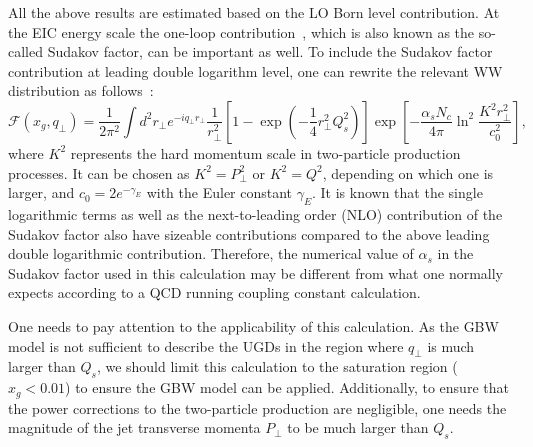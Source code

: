 All the above results are estimated based on the LO Born level
contribution. At the EIC energy scale the one-loop
contribution~\cite{Mueller:2012uf}, which is also known as the so-called Sudakov
factor, can be important as well. To include the Sudakov factor contribution at
leading double logarithm level, one can rewrite the relevant WW distribution as
follows~\cite{Mueller:2013wwa}:
\begin{equation}
\mathcal{F}(x_{g}, q_{\perp}) =
\frac{1}{2\pi^{2}} \int d^{2}r_{\perp} e^{-iq_{\perp}r_{\perp}}
\frac{1}{r^{2}_{\perp}}[1-\exp(-\frac{1}{4}r^{2}_{\perp}Q^{2}_{s})]
\exp[-\frac{\alpha_sN_c}{4\pi}\ln^2\frac{K^2r_{\perp}^2}{c^2_0}],
\label{eqn:Sudakov}
\end{equation}
where $K^2$ represents the hard momentum scale in two-particle production
processes. It can be chosen as $K^2=P^2_{\perp}$ or $K^2=Q^2$, depending on which
one is larger, and $c_0=2e^{-\gamma_E}$ with the Euler constant $\gamma_E$. It
is known that the single logarithmic terms as well as the next-to-leading order
(NLO) contribution of the Sudakov factor also have sizeable contributions 
compared to the above leading double logarithmic contribution. Therefore, the
numerical value of $\alpha_s$ in the Sudakov factor used in this calculation may
be different from what one normally expects according to a QCD running coupling
constant calculation.

One needs to pay attention to the applicability of this calculation.
As the GBW model is not sufficient to describe the UGDs in the region where 
$q_{\perp}$ is much larger than $Q_s$, we should limit this calculation to the
saturation region ($x_g<0.01$) to ensure the GBW model
can be applied. Additionally, to ensure that the power corrections to the
two-particle production are negligible, one needs the magnitude of the jet
transverse momenta $P_{\perp}$ to be much larger than $Q_s$.

